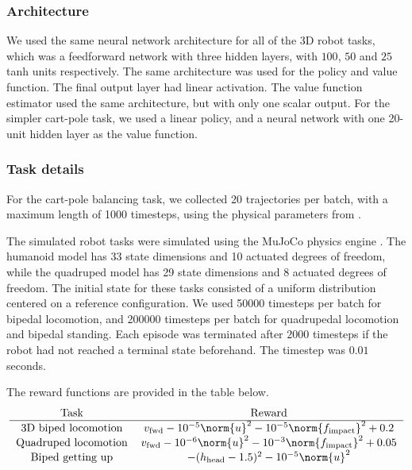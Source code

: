 \documentclass{article}
\begin{document}
\subsubsection{Architecture}


We used the same neural network architecture for all of the 3D robot tasks, which was a feedforward network with three hidden layers, with $100$, $50$ and $25$ tanh units respectively.
The same architecture was used for the policy and value function.
The final output layer had linear activation.
The value function estimator used the same architecture, but with only one scalar output.
For the simpler cart-pole task, we used a linear policy, and a neural network with one 20-unit hidden layer as the value function.


\subsubsection{Task details}

For the cart-pole balancing task, we collected 20 trajectories per batch, with a maximum length of 1000 timesteps, using the physical parameters from \citet{barto1983neuronlike}.


The simulated robot tasks were simulated using the MuJoCo physics engine \citep{todorov2012mujoco}.
The humanoid model has 33 state dimensions and 10 actuated degrees of freedom, while the quadruped model has 29 state dimensions and 8 actuated degrees of freedom. The initial state for these tasks consisted of a uniform distribution centered on a reference configuration.
We used 50000 timesteps per batch for bipedal locomotion, and 200000 timesteps per batch for quadrupedal locomotion and bipedal standing.
Each episode was terminated after $2000$ timesteps if the robot had not reached a terminal state beforehand.
The timestep was $0.01$ seconds.

The reward functions are provided in the table below.
\newcommand{\fimp}{f_{\mathrm{impact}}}
\begin{equation*} 
\begin{tabular}{cc}
Task & Reward \\
\hline
3D biped locomotion & $v_{\mathrm{fwd}} - 10^{-5} \norm{u}^2 - 10^{-5} \norm{\fimp}^2 + 0.2$\\
Quadruped locomotion & $v_{\mathrm{fwd}} - 10^{-6} \norm{u}^2 - 10^{-3}\norm{\fimp}^2 + 0.05$\\
Biped getting up & $-(h_{\rm head} - 1.5)^2 - 10^{-5} \norm{u}^2$\\
\end{tabular}
\end{equation*}
\end{document}
